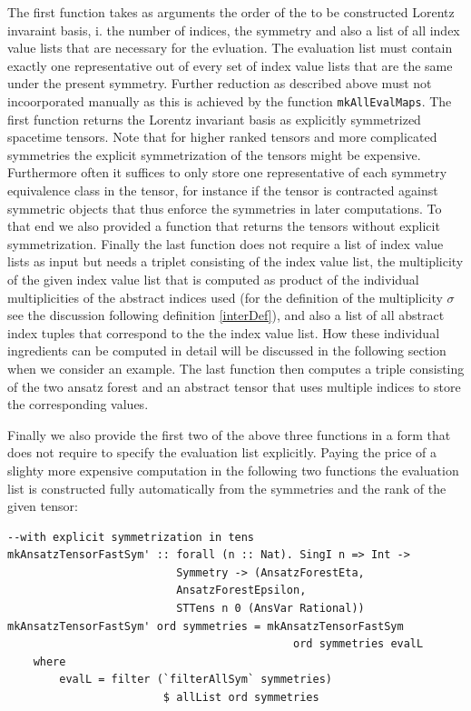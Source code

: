 \documentclass[a4paper,12pt, DIV=14, BCOR=5mm, twoside, headsepline]{scrbook}
\begin{document}
The first function takes as arguments the order of the to be constructed Lorentz invaraint basis, i. the number of indices, the symmetry and also a list of all index value lists that are necessary for the evluation. The evaluation list must contain exactly one representative out of every set of index value lists that are the same under the present symmetry. Further reduction as described above must not incoorporated manually as this is achieved by the function \texttt{mkAllEvalMaps}. The first function returns the Lorentz invariant basis as explicitly symmetrized spacetime tensors. Note that for higher ranked tensors and more complicated symmetries the explicit symmetrization of the tensors might be expensive. Furthermore often it suffices to only store one representative of each symmetry equivalence class in the tensor, for instance if the tensor is contracted against symmetric objects that thus enforce the symmetries in later computations. To that end we also provided a function that returns the tensors without explicit symmetrization. Finally the last function does not require a list of index value lists as input but needs a triplet consisting of the index value list, the multiplicity of the given index value list that is computed as product of the individual multiplicities of the abstract indices used (for the definition of the multiplicity $\sigma$ see the discussion following definition \ref{interDef}), and also a list of all abstract index tuples that correspond to the the index value list. How these individual ingredients can be computed in detail will be discussed in the following section when we consider an example. The last function then computes a triple consisting of the two ansatz forest and an abstract tensor that uses multiple indices to store the corresponding values. 

Finally we also provide the first two of the above three functions in a form that does not require to specify the evaluation list explicitly. Paying the price of a slighty more expensive computation in the following two functions the evaluation list is constructed fully automatically from the symmetries and the rank of the given tensor: 

\begin{samepage}
\begin{verbatim}
--with explicit symmetrization in tens
mkAnsatzTensorFastSym' :: forall (n :: Nat). SingI n => Int ->
                          Symmetry -> (AnsatzForestEta,
                          AnsatzForestEpsilon,
                          STTens n 0 (AnsVar Rational))
mkAnsatzTensorFastSym' ord symmetries = mkAnsatzTensorFastSym
                                            ord symmetries evalL
    where
        evalL = filter (`filterAllSym` symmetries) 
                        $ allList ord symmetries
\end{verbatim} 
\end{samepage}
\end{document}
